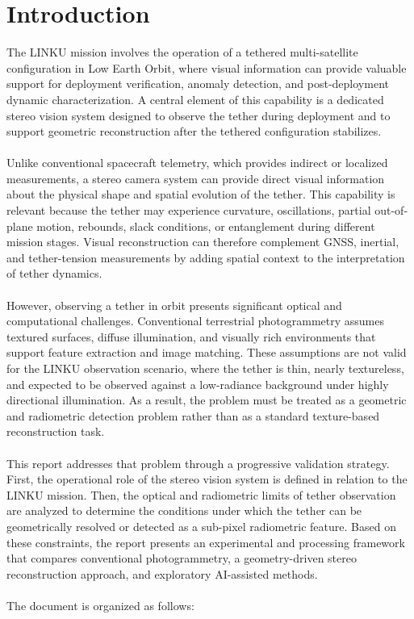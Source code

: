 \chapter*{Introduction}

The LINKU mission involves the operation of a tethered multi-satellite configuration in Low Earth Orbit, where visual information can provide valuable support for deployment verification, anomaly detection, and post-deployment dynamic characterization. A central element of this capability is a dedicated stereo vision system designed to observe the tether during deployment and to support geometric reconstruction after the tethered configuration stabilizes.
\\\\
Unlike conventional spacecraft telemetry, which provides indirect or localized measurements, a stereo camera system can provide direct visual information about the physical shape and spatial evolution of the tether. This capability is relevant because the tether may experience curvature, oscillations, partial out-of-plane motion, rebounds, slack conditions, or entanglement during different mission stages. Visual reconstruction can therefore complement GNSS, inertial, and tether-tension measurements by adding spatial context to the interpretation of tether dynamics.
\\\\
However, observing a tether in orbit presents significant optical and computational challenges. Conventional terrestrial photogrammetry assumes textured surfaces, diffuse illumination, and visually rich environments that support feature extraction and image matching. These assumptions are not valid for the LINKU observation scenario, where the tether is thin, nearly textureless, and expected to be observed against a low-radiance background under highly directional illumination. As a result, the problem must be treated as a geometric and radiometric detection problem rather than as a standard texture-based reconstruction task.
\\\\
This report addresses that problem through a progressive validation strategy. First, the operational role of the stereo vision system is defined in relation to the LINKU mission. Then, the optical and radiometric limits of tether observation are analyzed to determine the conditions under which the tether can be geometrically resolved or detected as a sub-pixel radiometric feature. Based on these constraints, the report presents an experimental and processing framework that compares conventional photogrammetry, a geometry-driven stereo reconstruction approach, and exploratory AI-assisted methods.
\\\\
The document is organized as follows:

